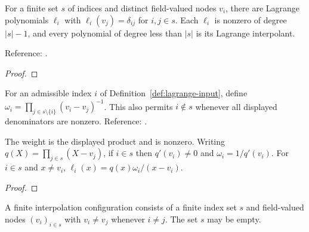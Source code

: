 \begin{supporting}
\begin{theorem}
\label{thm:lagrange-interpolation}
\leanok
For a finite set $s$ of indices and distinct field-valued nodes $v_i$, there are
Lagrange polynomials $\ell_i$ with $\ell_i(v_j)=\delta_{ij}$ for
$i,j\in s$. Each $\ell_i$ is nonzero of degree $|s|-1$, and every polynomial
of degree less than $|s|$ is its Lagrange interpolant.

Reference: \cite[3.3(i)]{dlmf}.
\end{theorem}
\begin{proof}
\leanok
\end{proof}

\begin{definition}
\label{def:lagrange-nodal-weight}
\leanok
For an admissible index $i$ of Definition~\ref{def:lagrange-input}, define
$\omega_i=\prod_{j\in s\setminus\{i\}}(v_i-v_j)^{-1}$.
This also permits $i\notin s$ whenever all displayed denominators are nonzero.
Reference: \cite[3.3(i)]{dlmf}.
\end{definition}

\begin{theorem}
\label{thm:lagrange-nodal-weight}
\leanok
The weight is the displayed product and is nonzero. Writing
$q(X)=\prod_{j\in s}(X-v_j)$, if $i\in s$ then $q'(v_i)\ne0$ and
$\omega_i=1/q'(v_i)$. For $i\in s$ and $x\ne v_i$,
$\ell_i(x)=q(x)\omega_i/(x-v_i)$.
\end{theorem}
\begin{proof}
\leanok
\end{proof}

\begin{definition}
\label{def:lagrange-interpolation-input}
\leanok
A finite interpolation configuration consists of a finite index set $s$
and field-valued nodes $(v_i)_{i\in s}$ with $v_i\ne v_j$ whenever $i\ne j$.
The set $s$ may be empty.
\end{definition}


\end{supporting}
